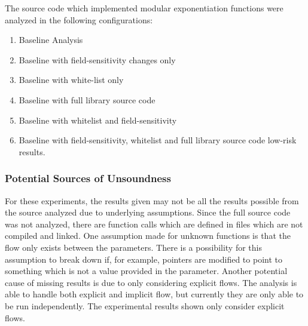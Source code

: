 The source code which implemented modular exponentiation functions were analyzed in the
following configurations:
\begin{enumerate}
\item Baseline Analysis
\item Baseline with field-sensitivity changes only
\item Baseline with white-list only
\item Baseline with full library source code
\item Baseline with whitelist and field-sensitivity
\item Baseline with field-sensitivity, whitelist and full library source code
low-risk results.
\end{enumerate}



\subsubsection{Potential Sources of Unsoundness}
For these experiments, the results given may not be all the results possible
from the source analyzed due to underlying assumptions. Since the full source
code was not analyzed, there are function calls which are defined in files which
are not compiled and linked. One assumption made for unknown functions is that
the flow only exists between the parameters. There is a possibility for this
assumption to break down if, for example, pointers are modified to point to
something which is not a value provided in the parameter. Another potential
cause of missing results is due to only considering explicit flows. The analysis
is able to handle both explicit and implicit flow, but currently they are only
able to be run independently. The experimental results shown only consider
explicit flows.

